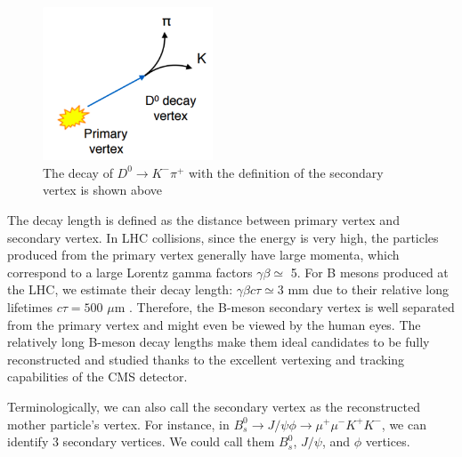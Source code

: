 \begin{figure}[hbtp]
\begin{center}
\includegraphics[width=0.45\textwidth]{Figures/Chapter4/D0Seconary.png}
\caption{The decay of $D^0 \rightarrow K^- \pi^+$ with the definition of the secondary vertex is shown above}
\label{D0Vtx}
\end{center}
\end{figure} 

The decay length is defined as the distance between primary vertex and secondary vertex. In LHC collisions, since the energy is very high, the particles produced from the primary vertex generally have large momenta, which correspond to a large Lorentz gamma factors $\gamma \beta \simeq$ 5. For B mesons produced at the LHC, we estimate their decay length: $\gamma \beta c \tau \simeq 3$ mm due to their relative long lifetimes $c \tau = 500$ $\mu$m \cite{AlphaTheoEx}. Therefore, the B-meson secondary vertex is well separated from the primary vertex and might even be viewed by the human eyes. The relatively long B-meson decay lengths make them ideal candidates to be fully reconstructed and studied thanks to the excellent vertexing and tracking capabilities of the CMS detector.

Terminologically, we can also call the secondary vertex as the reconstructed mother particle's vertex. For instance, in $B^0_s \rightarrow J/\psi \phi \rightarrow \mu^+\mu^- K^+K^-$, we can identify 3 secondary vertices. We could call them $B^0_s$, $J/\psi$, and $\phi$ vertices. 

